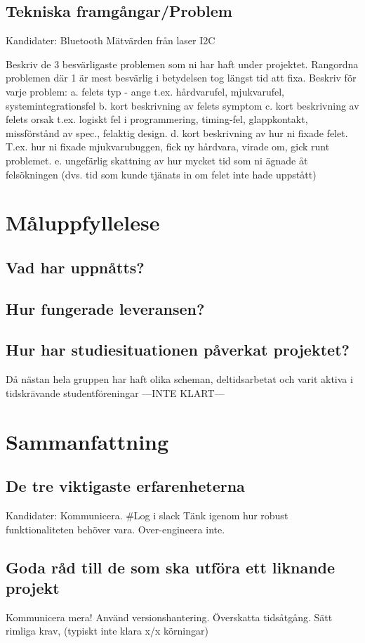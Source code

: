 \documentclass{article}
\begin{document}
\subsection{Tekniska framgångar/Problem}

Kandidater:
Bluetooth
Mätvärden från laser
I2C

Beskriv de 3 besvärligaste problemen som ni har haft under projektet. 
Rangordna problemen där 1 är mest besvärlig i betydelsen tog längst tid att fixa.
Beskriv för varje problem:
a. felets typ - ange t.ex.  hårdvarufel, mjukvarufel, systemintegrationsfel 
b. kort beskrivning av felets symptom 
c. kort beskrivning av felets orsak t.ex. logiskt fel i programmering, timing-fel, glappkontakt, missförstånd av spec., felaktig design. 
d. kort beskrivning av hur ni fixade felet. T.ex. hur ni fixade mjukvarubuggen, fick ny hårdvara, virade om, gick runt problemet.
e. ungefärlig skattning av hur mycket tid som ni ägnade åt felsökningen (dvs. tid som kunde tjänats in om felet inte hade uppstått)


\clearpage
\section{Måluppfyllelese}

\subsection{Vad har uppnåtts?}

\subsection{Hur fungerade leveransen?}


\subsection{Hur har studiesituationen påverkat projektet?}
Då nästan hela gruppen har haft olika scheman, deltidsarbetat och varit aktiva i tidskrävande studentföreningar ---INTE KLART---


\clearpage
\section{Sammanfattning}

\subsection{De tre viktigaste erfarenheterna}

Kandidater:
Kommunicera. #Log i slack
Tänk igenom hur robust funktionaliteten behöver vara. Over-engineera inte.

\subsection{Goda råd till de som ska utföra ett liknande projekt}
Kommunicera mera! Använd versionshantering. Överskatta tidsåtgång.
Sätt rimliga krav, (typiskt inte klara x/x körningar)

\nocite{*}
{}

\end{document}
